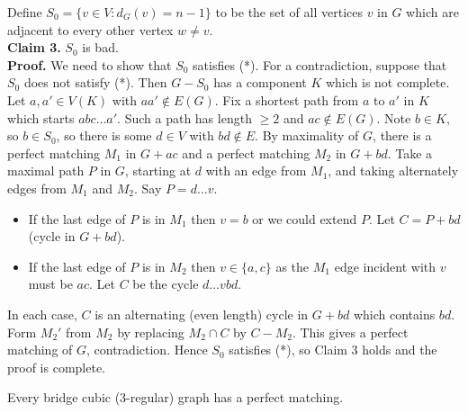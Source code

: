 \begin{theorem}[Tutte, 1947]
{    Define \(S_0 = \{ v \in V : d_G(v) = n - 1 \}\) to be the set of all vertices \(v\) in \(G\) which are adjacent to every other vertex \(w \neq v\). \\

    {\bf Claim 3.} \(S_0\) is bad. \\
    {\bf Proof.} We need to show that \(S_0\) satisfies (*). For a contradiction, suppose that \(S_0\) does not satisfy (*). Then \(G - S_0\) has a component \(K\) which is not complete. Let \(a, a' \in V(K)\) with \(aa' \notin E(G)\). Fix a shortest path from \(a\) to \(a'\) in \(K\) which starts \(abc \dots a'\). Such a path has length \(\geq 2\) and \(ac \notin E(G)\). Note \(b \in K\), so \(b \in S_0\), so there is some \(d \in V\) with \(bd \notin E\). By maximality of \(G\), there is a perfect matching \(M_1\) in \(G + ac\) and a perfect matching \(M_2\) in \(G + bd\). Take a maximal path \(P\) in \(G\), starting at \(d\) with an edge from \(M_1\), and taking alternately edges from \(M_1\) and \(M_2\). Say \(P = d \dots v\).
    \begin{itemize}
        \item If the last edge of \(P\) is in \(M_1\) then \(v = b\) or we could extend \(P\). Let \(C = P + bd\) (cycle in \(G + bd\)).
        \item If the last edge of \(P\) is in \(M_2\) then \(v \in \{a, c \}\) as the \(M_1\) edge incident with \(v\) must be \(ac\).  Let \(C\) be the cycle \(d \dots vbd \).
    \end{itemize}

    In each case, \(C\) is an alternating (even length) cycle in \(G + bd\) which contains \(bd\). Form \(M_2'\) from \(M_2\) by replacing \(M_2 \cap C\) by \(C-M_2\). This gives a perfect matching of \(G\), contradiction. Hence \(S_0\) satisfies (*), so Claim 3 holds and the proof is complete.
    }
\end{theorem}

\begin{corollary}[Petersen, 1891]
    Every bridge cubic (3-regular) graph has a perfect matching.
\end{corollary}
